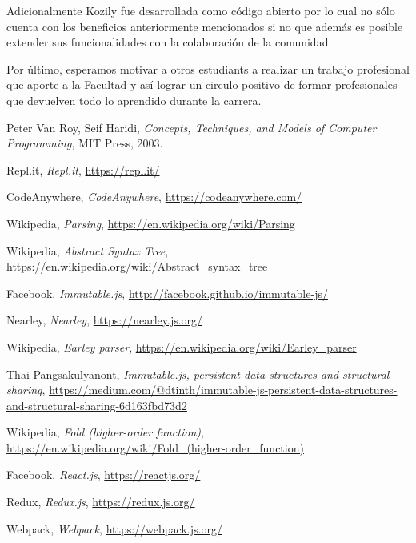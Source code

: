 \documentclass[a4paper,11pt]{article}
\begin{document}
Adicionalmente Kozily fue desarrollada como código abierto por lo cual no sólo cuenta con los beneficios anteriormente mencionados si no que además es posible extender sus funcionalidades con la colaboración de la comunidad.

Por último, esperamos motivar a otros estudiants a realizar un trabajo profesional que aporte a la Facultad y así lograr un circulo positivo de formar profesionales que devuelven todo lo aprendido durante la carrera.

\begin{thebibliography}{9}

Peter Van Roy, Seif Haridi,
\textit{Concepts, Techniques, and Models of Computer Programming},
MIT Press, 2003.

Repl.it,
\textit{Repl.it},
\url{https://repl.it/}

CodeAnywhere,
\textit{CodeAnywhere},
\url{https://codeanywhere.com/}

Wikipedia,
\textit{Parsing},
\url{https://en.wikipedia.org/wiki/Parsing}

Wikipedia,
\textit{Abstract Syntax Tree},
\url{https://en.wikipedia.org/wiki/Abstract_syntax_tree}

Facebook,
\textit{Immutable.js},
\url{http://facebook.github.io/immutable-js/}


Nearley,
\textit{Nearley},
\url{https://nearley.js.org/}


Wikipedia,
\textit{Earley parser},
\url{https://en.wikipedia.org/wiki/Earley_parser}


Thai Pangsakulyanont,
\textit{Immutable.js, persistent data structures and structural sharing},
\url{https://medium.com/@dtinth/immutable-js-persistent-data-structures-and-structural-sharing-6d163fbd73d2}

Wikipedia,
\textit{Fold (higher-order function)},
\url{https://en.wikipedia.org/wiki/Fold_(higher-order_function)}

Facebook,
\textit{React.js},
\url{https://reactjs.org/}

Redux,
\textit{Redux.js},
\url{https://redux.js.org/}

Webpack,
\textit{Webpack},
\url{https://webpack.js.org/}


\end{thebibliography}
\end{document}
